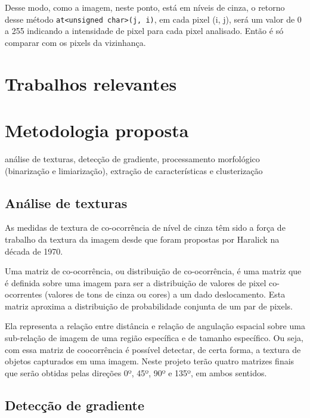 \documentclass[10pt,twocolumn,letterpaper]{article}
\begin{document}
	Desse modo, como a imagem, neste ponto, está em níveis de cinza, o retorno
desse método \verb'at<unsigned char>(j, i)', em cada pixel (i, j), será um valor de
0 a 255 indicando a intensidade de pixel para cada pixel analisado. Então é só comparar
com os pixels da vizinhança.




\section{Trabalhos relevantes}




\section{Metodologia proposta}
análise de texturas, detecção de gradiente,
processamento morfológico (binarização e limiarização), extração de características
e clusterização

\subsection{Análise de texturas}

	As medidas de textura de co-ocorrência de nível de cinza têm sido a força de trabalho
da textura da imagem desde que foram propostas por Haralick{\footnotesize \cite{haralick}}
na década de 1970.

	Uma matriz de co-ocorrência, ou distribuição de co-ocorrência,{\footnotesize \cite{GLCM-tutorial}}
é uma matriz que é definida sobre uma imagem para ser a distribuição de valores de pixel
co-ocorrentes (valores de tons de cinza ou cores) a um dado deslocamento. Esta matriz
aproxima a distribuição de probabilidade conjunta de um par de pixels.

	Ela representa a relação entre distância e relação de angulação espacial sobre uma
sub-relação de imagem de uma região específica e de tamanho específico. Ou seja, com
essa matriz de coocorrência é possível detectar, de certa forma, a textura de objetos
capturados em uma imagem. Neste projeto terão quatro matrizes finais que serão obtidas
pelas direções 0º, 45º, 90º e 135º, em ambos sentidos.


\subsection{Detecção de gradiente}
	
\end{document}
